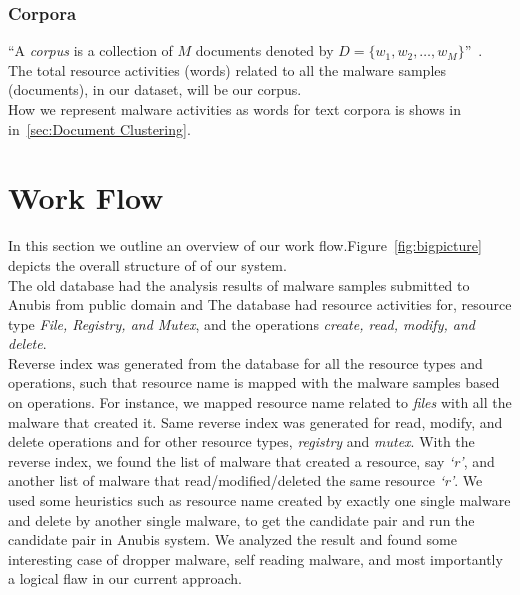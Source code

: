 \subsubsection{Corpora}
\label{ssub:Corpora}
``A \emph{corpus} is a collection of $M$ documents denoted by $D = \{w_1,w_2,\ldots,w_M\}$''~\cite[]{Blei}.\\
The total resource activities (words) related to all the malware samples (documents), in our dataset, will be our corpus.\\

How we represent malware activities as words for text corpora is shows in in~\autoref{sec:Document Clustering}.
\section{Work Flow}
\label{sec:Work Flow}
In this section we outline an overview of our work flow.Figure~\ref{fig:bigpicture} depicts the overall structure of of our system.\\
The old database had the analysis results of malware samples submitted to Anubis from public domain and 
The database had resource activities for, resource type \emph{File, Registry, and Mutex}, and the operations \emph{create, read, modify, and delete}.\\
Reverse index was generated from the database for all the resource types and operations, such that resource name is mapped with the malware samples based on operations.
For instance, we mapped resource name related to \emph{files} with all the malware that created it.
Same reverse index was generated for read, modify, and delete operations and for other resource types, \emph{registry} and \emph{mutex}.
With the reverse index, we found the list of malware that created a resource, say \emph{`r'}, and another list of malware that read/modified/deleted the same resource \emph{`r'}.
We used some heuristics such as resource name created by exactly one single malware and delete by another single malware, to get the candidate pair and run the candidate pair in Anubis system.
We analyzed the result and found some interesting case of dropper malware, self reading malware, and most importantly a logical flaw in our current approach.\\
